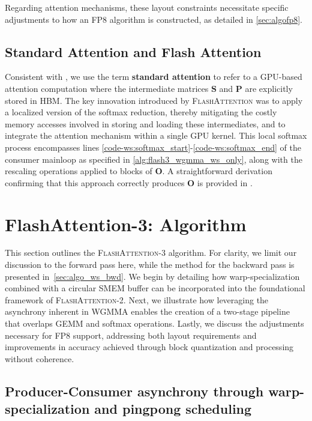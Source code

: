 Regarding attention mechanisms, these layout constraints necessitate specific adjustments to how an FP8 algorithm is constructed, as detailed in \cref{sec:algofp8}.

\subsection{Standard Attention and Flash Attention} Consistent with \citet{dao2022flashattention}, we use the term \textbf{standard attention} to refer to a GPU-based attention computation where the intermediate matrices $\mathbf{S}$ and $\mathbf{P}$ are explicitly stored in HBM. The key innovation introduced by \textsc{FlashAttention} was to apply a localized version of the softmax reduction, thereby mitigating the costly memory accesses involved in storing and loading these intermediates, and to integrate the attention mechanism within a single GPU kernel. This local softmax process encompasses lines \ref{code-ws:softmax_start}-\ref{code-ws:softmax_end} of the consumer mainloop as specified in \cref{alg:flash3_wgmma_ws_only}, along with the rescaling operations applied to blocks of $\mathbf{O}$. A straightforward derivation confirming that this approach correctly produces $\mathbf{O}$ is provided in \cite[\S 2.3.1]{dao2023flashattention2}.

\section{FlashAttention-3: Algorithm}
\label{sec:algo}

This section outlines the \textsc{FlashAttention-3} algorithm. For clarity, we limit our discussion to the forward pass here, while the method for the backward pass is presented in~\cref{sec:algo_ws_bwd}. We begin by detailing how warp-specialization combined with a circular SMEM buffer can be incorporated into the foundational framework of \textsc{FlashAttention-2}. Next, we illustrate how leveraging the asynchrony inherent in WGMMA enables the creation of a two-stage pipeline that overlaps GEMM and softmax operations. Lastly, we discuss the adjustments necessary for FP8 support, addressing both layout requirements and improvements in accuracy achieved through block quantization and processing without coherence.

\subsection{Producer-Consumer asynchrony through warp-specialization and pingpong scheduling}
\label{sec:algo_ws}

